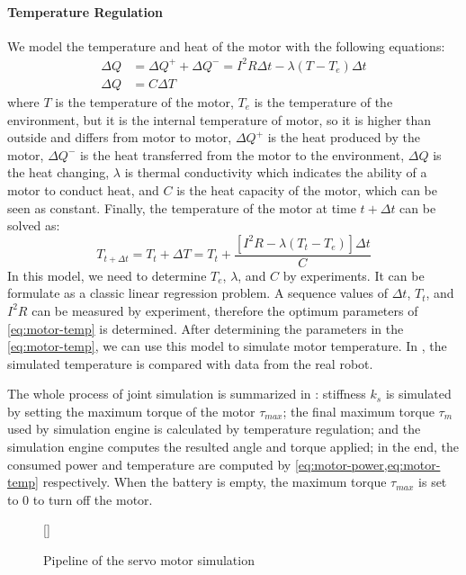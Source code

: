\documentclass{llncs}
\newcommand{\inputtikz}[1]
{
  \StrSubstitute{#1}{/}{.}[\fn]
  \scancs{\filename}{\fn}
  \tikzsetfigurename{\filename}
  
}
\begin{document}
\paragraph{Temperature Regulation}
We model the temperature and heat of the motor with the following equations:
\begin{align}
  \Delta{}Q &= \Delta{}Q^+ + \Delta{}Q^- = I^2R\Delta{}t -\lambda(T-T_e)\Delta{}t \\
  \Delta{}Q &= C\Delta{}T
\end{align}
where $T$ is the temperature of the motor, $T_e$
is the temperature of the environment, but it is the internal temperature
of motor, so it is higher than outside and differs from motor to
motor, $\Delta{}Q^+$ is the heat produced by the motor, $\Delta{}Q^-$ is
the heat transferred from the motor to the environment, $\Delta{}Q$ is the
heat changing, $\lambda$ is thermal conductivity which indicates the
ability of a motor to conduct heat, and $C$ is the heat capacity of
the motor, which can be seen as constant. Finally, the temperature of
the motor at time $t+\Delta{}t$ can be solved as:
\begin{equation}
  \label{eq:motor-temp}
  T_{t+\Delta{}t} = T_t + \Delta{}T = T_t + \frac{[I^2R-\lambda(T_t-T_e)]\Delta{}t}{C}
\end{equation}
In this model, we need to determine $T_e$, $\lambda$, and $C$ by experiments. It can be formulate as a classic linear regression problem.
A sequence values of $\Delta{}t$, $T_t$, and $I^2R$ can be measured by experiment, therefore the optimum parameters of \cref{eq:motor-temp} is determined.
After determining the parameters in the \cref{eq:motor-temp}, we can use this model to simulate motor temperature. In , the simulated temperature is compared with data from the real robot.

The whole process of joint simulation is summarized in
: stiffness $k_s$ is simulated by setting the maximum torque
of the motor $\tau_{max}$; the final maximum torque $\tau_m$ used by simulation engine is calculated by temperature regulation; and the simulation engine computes the resulted angle
and torque applied; in the end, the consumed power and temperature are
computed by \cref{eq:motor-power,eq:motor-temp} respectively. When the battery is empty, the maximum torque $\tau_{max}$ is set to 0 to turn off the motor.
\begin{figure}
  \centering
  \inputtikz{joint}
  \caption{Pipeline of the servo motor simulation}
  \label{fig:joint}
\end{figure}
\end{document}
